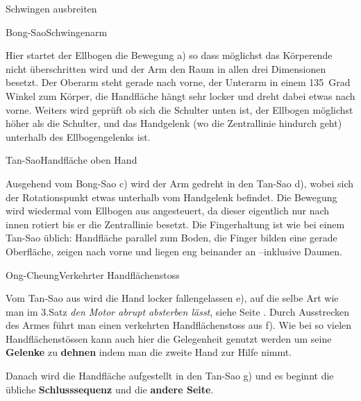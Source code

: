 \begin{WTSatz}{Schwingen ausbreiten}%

	
	\begin{WTSatzTeil}{Bong-Sao}{Schwingenarm}
		
		Hier startet der Ellbogen die Bewegung a) so dass m\"oglichst das K\"orperende nicht \"uberschritten wird und der Arm den Raum in allen drei Dimensionen besetzt. Der Oberarm steht gerade nach vorne, der Unterarm in einem 135~Grad Winkel zum K\"orper, die Handfl\"ache h\"angt sehr locker und dreht dabei etwas nach vorne. Weiters wird gepr\"uft ob sich die Schulter unten ist, der Ellbogen m\"oglichst h\"oher als die Schulter, und das Handgelenk (wo die Zentrallinie hindurch geht) unterhalb des Ellbogengelenks ist.
		
	\end{WTSatzTeil}
	\begin{WTSatzTeil}{Tan-Sao}{Handfl\"ache oben Hand}
		
		Ausgehend vom Bong-Sao c) wird der Arm gedreht in den Tan-Sao d), wobei sich der Rotationspunkt etwas unterhalb vom Handgelenk befindet. Die Bewegung wird wiedermal vom Ellbogen aus angesteuert, da dieser eigentlich nur nach innen rotiert bis er die Zentrallinie besetzt.
		Die Fingerhaltung ist wie bei einem Tan-Sao \"ublich: Handfl\"ache parallel zum Boden, die Finger bilden eine gerade Oberfl\"ache, zeigen nach vorne und liegen eng beinander an --inklusive Daumen.
		
	\end{WTSatzTeil}
	\begin{WTSatzTeil}{Ong-Cheung}{Verkehrter Handfl\"achenstoss}
		
		Vom Tan-Sao aus wird die Hand locker fallengelassen e), auf die selbe Art wie man im 3.Satz \textit{den Motor abrupt absterben l\"asst}, siehe Seite \pageref{LBL_motorabsterben}. Durch Ausstrecken des Armes f\"uhrt man einen verkehrten Handfl\"achenstoss aus f). Wie bei so vielen Handfl\"achenst\"ossen kann auch hier die Gelegenheit genutzt werden um seine \textbf{Gelenke} zu \textbf{dehnen} indem man die zweite Hand zur Hilfe nimmt.
		
		Danach wird die Handfl\"ache aufgestellt in den Tan-Sao g) und es beginnt die \"ubliche \textbf{Schlusssequenz} und die \textbf{andere Seite}.
		
	\end{WTSatzTeil}
\end{WTSatz}

